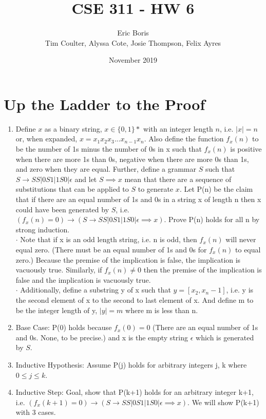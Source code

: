 \documentclass[11pt]{article}
\title{CSE 311 - HW 6}
\author{Eric Boris \\ Tim Coulter, Alyssa Cote, Josie Thompson, Felix Ayres}
\date{November 2019}
\makeatletter
\renewcommand{\maketitle}{\bgroup\setlength{\parindent}{0pt}
\begin{flushleft}
  \textbf{\@title}

  \@author
  
  \@date
\end{flushleft}\egroup
}
\def\imp{\rightarrow}
\makeatother
\begin{document}
\maketitle

\section{Up the Ladder to the Proof} %
\begin{enumerate}
	\item Define $x$ as a binary string, $x \in \{0,1\}*$ with an integer length $n$, i.e. $|x| = n$ or, when expanded, $x = x_1 x_2 x_3 ... x_{n-1} x_n$. Also define the function $f_x(n)$ to be the number of 1s minus the number of 0s in x such that $f_x(n)$ is positive when there are more 1s than 0s, negative when there are more 0s than 1s, and zero when they are equal. Further, define a grammar $S$ such that $S \imp SS|0S1|1S0|\epsilon$ and let $S \implies x$ mean that there are a sequence of substitutions that can be applied to $S$ to generate $x$. Let P(n) be the claim that if there are an equal number of 1s and 0s in a string x of length n then x could have been generated by $S$, i.e. $(f_x(n)=0) \imp (S \imp SS|0S1|1S0|\epsilon \implies x)$. Prove P(n) holds for all n by strong induction.\\
	
	$\cdot$ Note that if x is an odd length string, i.e. n is odd, then $f_x(n)$ will never equal zero. (There must be an equal number of 1s and 0s for $f_x(n)$ to equal zero.) Because the premise of the implication is false, the implication is vacuously true. Similarly, if $f_x(n)\neq 0$ then the premise of the implication is false and the implication is vacuously true. \\
	
	$\cdot$ Additionally, define a substring y of x such that $y = [x_2, x_n-1]$, i.e. y is the second element of x to the second to last element of x. And define m to be the integer length of y, $|y| = m$ where m is less than n.  
	
	\item Base Case: P(0) holds because $f_x(0)=0$ (There are an equal number of 1s and 0s. None, to be precise.) and x is the empty string $\epsilon$ which is generated by $S$. 
	\item Inductive Hypothesis: Assume P(j) holds for arbitrary integers j, k where $0 \leq j \leq k$. 
	\item Inductive Step: Goal, show that P(k+1) holds for an arbitrary integer k+1, i.e. $(f_x(k+1)=0) \imp (S \imp SS|0S1|1S0|\epsilon \implies x)$. We will show P(k+1) with 3 cases. \\


\end{enumerate}
\end{document}
